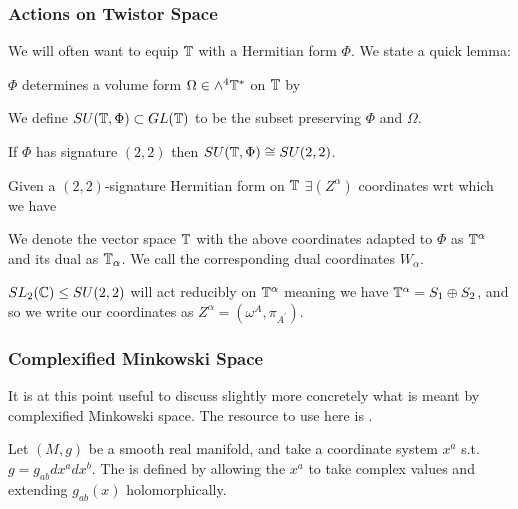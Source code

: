 \documentclass{article}
\begin{document}
\subsubsection{Actions on Twistor Space}
We will often want to equip $\mathbb{T}$ with a Hermitian form $\Phi$. We state a quick lemma:
\begin{lemma}
	$\Phi$ determines a volume form $\Omega \in \wedge^4 \mathbb{T}^\ast$ on $\mathbb{T}$ by 
	\eq{
\Omega = \image \Phi \wedge \image \Phi 
}
\end{lemma}
\begin{definition}
	We define $SU(\mathbb{T},\Phi) \subset GL(\mathbb{T})$ to be the subset preserving $\Phi$ and $\Omega$.  
\end{definition}
\begin{example}
	If $\Phi$ has signature $(2,2)$ then $SU(\mathbb{T},\Phi) \cong SU(2,2)$. 
\end{example}
Given a $(2,2)$-signature Hermitian form on $\mathbb{T}$ $\exists(Z^\alpha)$ coordinates wrt which we have 
\begin{notation}
	We denote the vector space $\mathbb{T}$ with the above coordinates adapted to $\Phi$ as $\mathbb{T}^\alpha$ and its dual as $\mathbb{T}_\alpha$. We call the corresponding dual coordinates $W_\alpha$. 
\end{notation}
$SL_2(\mathbb{C}) \leq SU(2,2)$ will act reducibly on $\mathbb{T}^\alpha$ meaning we have $\mathbb{T}^\alpha = S_1 \oplus S_2$, and so we write our coordinates as $Z^\alpha = (\omega^A, \pi_{A^\prime})$. 



\subsubsection{Complexified Minkowski Space}
It is at this point useful to discuss slightly more concretely what is meant by complexified Minkowski space. The resource to use here is \cite{Adamo2018}. 
\begin{definition}
	Let $(M,g)$ be a smooth real manifold, and take a coordinate system $x^a$ s.t. $g= g_{ab} dx^a dx^b$. The  is defined by allowing the $x^a$ to take complex values and extending $g_{ab}(x)$ holomorphically.  
\end{definition}
\end{document}
